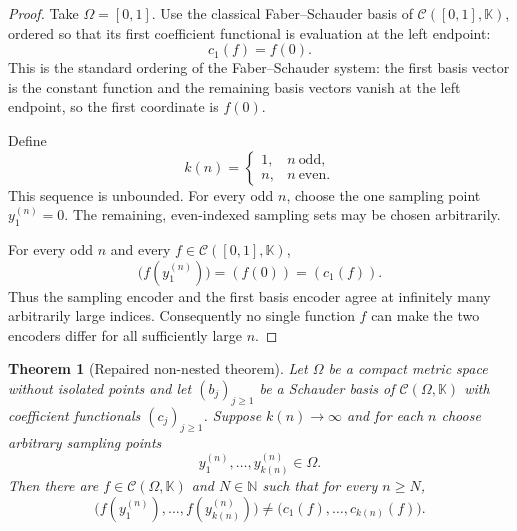 \documentclass[11pt]{article}
\newtheorem{theorem}{Theorem}
\newcommand{\K}{\mathbb K}
\newcommand{\N}{\mathbb N}
\newcommand{\C}{\mathcal C}
\newcommand{\OmegaX}{\Omega}
\begin{document}
\begin{proof}
Take $\OmegaX=[0,1]$.  Use the classical Faber--Schauder basis of
$\C([0,1],\K)$, ordered so that its first coefficient functional is evaluation
at the left endpoint:
\[
  c_1(f)=f(0).
\]
This is the standard ordering of the Faber--Schauder system: the first basis
vector is the constant function and the remaining basis vectors vanish at the
left endpoint, so the first coordinate is $f(0)$.

Define
\[
  k(n)=
  \begin{cases}
    1, & n\ \textrm{odd},\\
    n, & n\ \textrm{even}.
  \end{cases}
\]
This sequence is unbounded.  For every odd $n$, choose the one sampling point
$y_1^{(n)}=0$.  The remaining, even-indexed sampling sets may be chosen
arbitrarily.

For every odd $n$ and every $f\in\C([0,1],\K)$,
\[
  \bigl(f(y_1^{(n)})\bigr)=(f(0))=(c_1(f)).
\]
Thus the sampling encoder and the first basis encoder agree at infinitely many
arbitrarily large indices.  Consequently no single function $f$ can make the
two encoders differ for all sufficiently large $n$.
\end{proof}

\begin{theorem}[Repaired non-nested theorem]
\label{thm:repair}
Let $\OmegaX$ be a compact metric space without isolated points and let
$(b_j)_{j\ge 1}$ be a Schauder basis of $\C(\OmegaX,\K)$ with coefficient
functionals $(c_j)_{j\ge 1}$.  Suppose $k(n)\to\infty$ and for each $n$ choose
arbitrary sampling points
\[
  y_1^{(n)},\ldots,y_{k(n)}^{(n)}\in \OmegaX .
\]
Then there are $f\in\C(\OmegaX,\K)$ and $N\in\N$ such that for every $n\ge N$,
\[
  \bigl(f(y_1^{(n)}),\ldots,f(y_{k(n)}^{(n)})\bigr)
  \ne
  \bigl(c_1(f),\ldots,c_{k(n)}(f)\bigr).
\]
\end{theorem}
\end{document}

